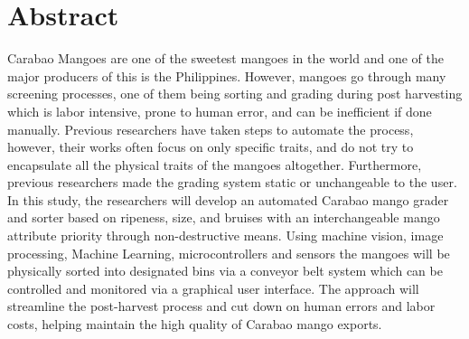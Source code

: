 \chapter*{Abstract}
Carabao Mangoes are one of the sweetest mangoes in the world and one
 of the major producers of this is the Philippines.
  However, mangoes go through many screening processes, one of them being 
  sorting and grading during post harvesting which is labor intensive, prone
   to human error, and can be inefficient if done manually. Previous researchers
    have taken steps to automate the process, however, their works often focus on 
    only specific traits, and do not try to encapsulate all the physical traits
     of the mangoes altogether. Furthermore, previous researchers made the grading 
     system static or unchangeable to the user. In this study, the researchers
      will develop an automated Carabao mango grader and sorter based on ripeness, 
      size, and bruises with an interchangeable mango attribute priority through 
      non-destructive means. Using machine vision, image processing, Machine Learning,
       microcontrollers and sensors the mangoes will be physically sorted into designated
        bins via a conveyor belt system which can be controlled and monitored via a graphical
         user interface. The approach will streamline the post-harvest process and cut down on 
         human errors and labor costs, helping maintain the high quality of Carabao mango exports. 
         
